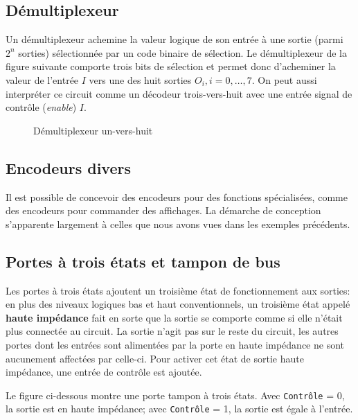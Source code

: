 \documentclass[11pt]{article}
\begin{document}
\subsection{Démultiplexeur}
\label{sec:org7662247}

Un démultiplexeur achemine la valeur logique de son entrée à une
sortie (parmi \(2^n\) sorties) sélectionnée par un code binaire de
sélection. Le démultiplexeur de la figure suivante comporte trois bits
de sélection et permet donc d'acheminer la valeur de l'entrée \(I\)
vers une des huit sorties \(O_i, i = 0, \ldots, 7\). On peut aussi
interpréter ce circuit comme un décodeur trois-vers-huit avec une
entrée signal de contrôle (\emph{enable}) \(I\).

\begin{figure}[htbp]
\centering

\caption{\label{fig:orgcc2eb8b}Démultiplexeur un-vers-huit}
\end{figure}

\subsection{Encodeurs divers}
\label{sec:orge6d88e7}

Il est possible de concevoir des encodeurs pour des fonctions
spécialisées, comme des encodeurs pour commander des affichages. La
démarche de conception s'apparente largement à celles que nous avons
vues dans les exemples précédents.


\subsection{Portes à trois états et tampon de bus}
\label{sec:orgc59fe77}

Les portes à trois états ajoutent un troisième état de fonctionnement
aux sorties: en plus des niveaux logiques bas et haut conventionnels,
un troisième état appelé \textbf{haute impédance} fait en sorte que la sortie
se comporte comme si elle n'était plus connectée au circuit. La sortie
n'agit pas sur le reste du circuit, les autres portes dont les entrées
sont alimentées par la porte en haute impédance ne sont aucunement
affectées par celle-ci. Pour activer cet état de sortie
haute impédance, une entrée de contrôle est ajoutée.


Le figure ci-dessous montre une porte tampon à trois états. Avec
\texttt{Contrôle} = 0, la sortie est en haute impédance; avec  \texttt{Contrôle} = 1,
la sortie est égale à l'entrée.
\end{document}
